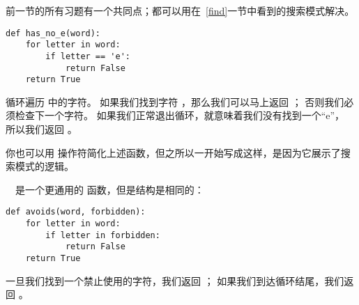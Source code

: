 
前一节的所有习题有一个共同点；都可以用在~\ref{find}一节中看到的搜索模式解决。

\begin{lstlisting}
def has_no_e(word):
    for letter in word:
        if letter == 'e':
            return False
    return True
\end{lstlisting}

%

 循环遍历  中的字符。
如果我们找到字符 ，那么我们可以马上返回  ；
否则我们必须检查下一个字符。
如果我们正常退出循环，就意味着我们没有找到一个“e”， 所以我们返回  。


  


你也可以用  操作符简化上述函数，但之所以一开始写成这样，是因为它展示了搜索模式的逻辑。



　是一个更通用的  函数，但是结构是相同的：

\begin{lstlisting}
def avoids(word, forbidden):
    for letter in word:
        if letter in forbidden:
            return False
    return True
\end{lstlisting}


一旦我们找到一个禁止使用的字符，我们返回  ；
如果我们到达循环结尾，我们返回  。


